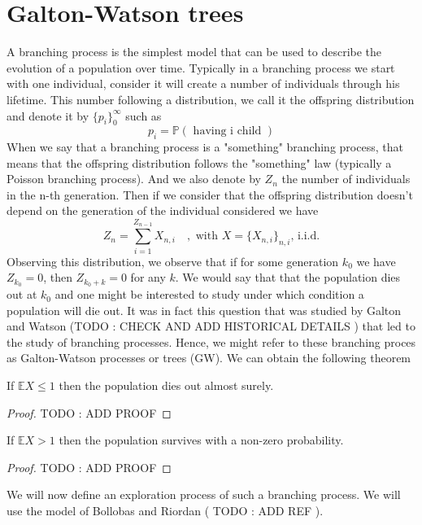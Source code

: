 \section{Galton-Watson trees}
A branching process is the simplest model that can be used to describe the evolution of a population over time.
Typically in a branching process we start with one individual, consider it will create a number of individuals through his lifetime. 
This number following a distribution, we call it the offspring distribution and denote it by $\{p_i\}_0^{\infty}$ such as
\begin{equation}
	p_i = \mathbb{P}(\text{ having i child })
\end{equation}
When we say that a branching process is a "something" branching process, that means that the offspring distribution follows the "something" law (typically a Poisson branching process).
And we also denote by $Z_n$ the number of individuals in the n-th generation. 
Then if we consider that the offspring distribution doesn't depend on the generation of the individual considered we have
\begin{equation}
	Z_n = \sum_{i=1}^{Z_{n-1}}X_{n, i} \quad, \text{ with } X = \{X_{n,i}\}_{n,i} \text{,  i.i.d.}
\end{equation}
Observing this distribution, we observe that if for some generation $k_0$ we have $Z_{k_0} = 0$, then $Z_{k_0 + k} = 0$ for any $k$. We would say that that the population dies out at $k_0$ and one might be interested to study under which condition a population will die out.
It was in fact this question that was studied by Galton and Watson (TODO : CHECK AND ADD HISTORICAL DETAILS ) that led to the study of branching processes. 
Hence, we might refer to these branching proces as Galton-Watson processes or trees (GW).
We can obtain the following theorem
\begin{theorem}
	If $\mathbb{E}X \leq 1$ then the population dies out almost surely.
\end{theorem}
\begin{proof}
	TODO : ADD PROOF
\end{proof}
\begin{theorem}
	If $\mathbb{E}X > 1$ then the population survives with a non-zero probability.
\end{theorem}
\begin{proof}
	TODO : ADD PROOF
\end{proof}
We will now define an exploration process of such a branching process. We will use the model of Bollobas and Riordan ( TODO : ADD REF ).
